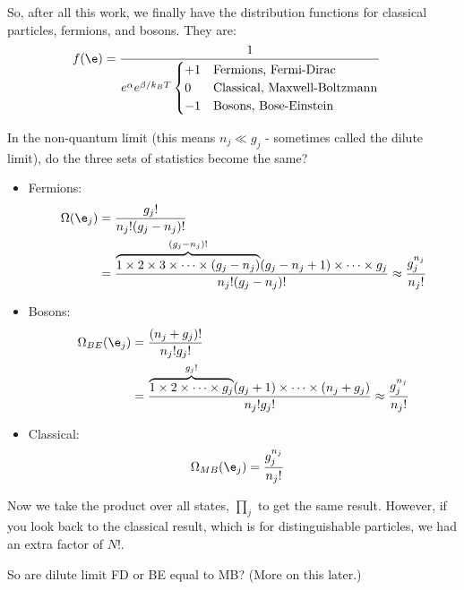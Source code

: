 \documentclass[a4paper, 11pt, normalem]{report}
\begin{document}
So, after all this work, we finally have the distribution functions for classical particles, fermions, and bosons.
They are:
\begin{align}
    f(\e) &= \frac{1}{e^{\alpha}e^{\beta/k_BT}\begin{cases} +1 & \text{Fermions, Fermi-Dirac} \\ 0 & \text{Classical, Maxwell-Boltzmann} \\ -1 & \text{Bosons, Bose-Einstein} \end{cases}}
\end{align}

\begin{example}
    In the non-quantum limit (this means $n_j \ll g_j$ - sometimes called the dilute limit), do the three sets of statistics become the same?
    \begin{itemize}
        \item Fermions:
            \begin{align}
                \Omega(\e_j) &= \frac{g_j!}{n_j!(g_j-n_j)!} \\
                             &= \frac{\overbrace{1\times2\times3\times\cdots\times(g_j-n_j)}^{(g_j-n_j)!}(g_j-n_j+1)\times\cdots\times g_j}{n_j!(g_j-n_j)!} \approx \frac{g_j^{n_j}}{n_j!}
            \end{align}
        \item Bosons:
            \begin{align}
                \Omega_{BE}(\e_j) &= \frac{(n_j+g_j)!}{n_j!g_j!} \\
                            &= \frac{\overbrace{1\times2\times\cdots\times g_j}^{g_j!}(g_j+1)\times\cdots\times(n_j+g_j)}{n_j!g_j!} \approx \frac{g_j^{n_j}}{n_j!}
            \end{align}
        \item Classical:
            \begin{align}
                \Omega_{MB}(\e_j) &= \frac{g_j^{n_j}}{n_j!}
            \end{align}
    \end{itemize}
    Now we take the product over all states, $\prod_j$ to get the same result. 
    However, if you look back to the classical result, which is for distinguishable particles, we had an extra factor of $N!$.

    So are dilute limit FD or BE equal to MB?  (More on this later.)
\end{example}
\end{document}
